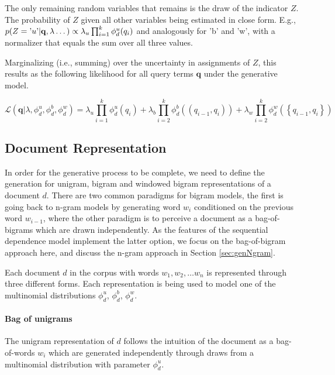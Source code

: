\documentclass[]{article}
\begin{document}
The only remaining random variables that remains is the draw of the
indicator $Z$. The probability of $Z$ given all other variables
being estimated in close form. E.g., $p(Z=\mbox{'}u\mbox{'}|\mathbf{q},\mbox{\ensuremath{\lambda}}\dots)\propto\lambda_{u}\prod_{i=1}^{k}\phi_{d}^{u}(q_{i})$
and analogously for 'b' and 'w', with a normalizer that equals the
sum over all three values.

Marginalizing (i.e., summing) over the uncertainty in assignments
of $Z$, this results as the following likelihood for all query terms
$\mathbf{q}$ under the generative model.

\begin{equation}
\mathcal{L}(\mathbf{q}|\lambda,\phi_{d}^{u},\phi_{d}^{b},\phi_{d}^{w})=\lambda_{u}\prod_{i=1}^{k}\phi_{d}^{u}(q_{i})+\lambda_{b}\prod_{i=2}^{k}\phi_{d}^{b}(\left(q_{i-1},q_{i}\right))+\lambda_{w}\prod_{i=2}^{k}\phi_{d}^{w}(\left\{ q_{i-1},q_{i}\right\} ) \label{eq:genmodel-likelihood}
\end{equation}

\subsection{Document Representation\label{subsec:Document-Representation-feature}}

In order for the generative process to be complete, we need to define
the generation for unigram, bigram and windowed bigram representations
of a document $d$. There are two common paradigms for bigram models,
the first is going back to n-gram models by generating word $w_{i}$
conditioned on the previous word $w_{i-1}$, where the other paradigm
is to perceive a document as a bag-of-bigrams which are drawn independently.
As the features of the sequential dependence model implement the latter
option, we focus on the bag-of-bigram approach here, and discuss the
n-gram approach in Section \ref{sec:genNgram}.

Each document $d$ in the corpus with words $w_{1},w_{2},\dots w_{n}$
is represented through three different forms. Each representation
is being used to model one of the multinomial distributions $\phi_{d}^{u}$,
$\phi_{d}^{b}$, $\phi_{d}^{w}$.

\paragraph{Bag of unigrams}

The unigram representation of $d$ follows the intuition of the document
as a bag-of-words $w_{i}$ which are generated independently through
draws from a multinomial distribution with parameter $\phi_{d}^{u}$. 
\end{document}
